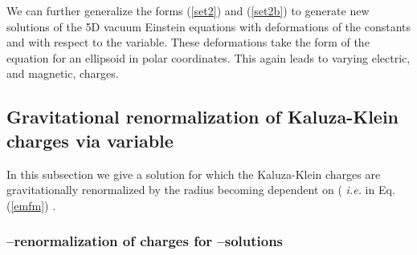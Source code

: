 \documentclass[a4paper,preprint,prabib,aps]{revtex4}
\begin{document}
We can further generalize the forms (\ref{set2}) and (\ref{set2b}) to
generate new solutions of the 5D vacuum Einstein equations with deformations
of the constants \coordHE{} and \coordHE{} with respect to the \myHighlight{$\theta$}\coordHE{} variable.
These \myHighlight{$\theta$}\coordHE{} deformations take the form of the equation for an ellipsoid
in polar coordinates. This again leads to varying electric, \coordHE{} and
magnetic, \coordHE{} charges.

\subsection{Gravitational renormalization of Kaluza-Klein charges via
variable \coordHE{}}

In this subsection we give a solution for which the Kaluza-Klein charges are
gravitationally renormalized by the radius becoming dependent on \myHighlight{$\theta$}\coordHE{} (%
{\it i.e.} in Eq. (\ref{emfm}) \coordHE{}.

\subsubsection{\myHighlight{$\protect\theta$}\coordHE{}--renormalization of charges for \myHighlight{$\protect\chi
$}\coordHE{}--solutions}
\end{document}
